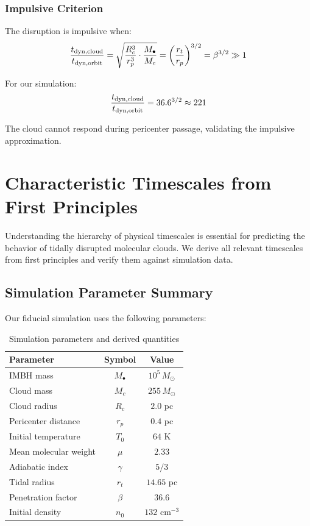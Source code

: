 \documentclass[twocolumn,amsmath,amssymb,prd,superscriptaddress,nofootinbib]{revtex4-2}
\begin{document}
\subsubsection{Impulsive Criterion}

The disruption is impulsive when:
\begin{equation}
    \frac{t_{\rm dyn,cloud}}{t_{\rm dyn,orbit}} = \sqrt{\frac{R_c^3}{r_p^3}\cdot\frac{M_\bullet}{M_c}} = \left(\frac{r_t}{r_p}\right)^{3/2} = \beta^{3/2} \gg 1
    \label{eq:impulsive}
\end{equation}

For our simulation:
\begin{equation}
    \frac{t_{\rm dyn,cloud}}{t_{\rm dyn,orbit}} = 36.6^{3/2} \approx 221
\end{equation}

The cloud cannot respond during pericenter passage, validating the impulsive approximation.

\section{Characteristic Timescales from First Principles}
\label{sec:timescales}

Understanding the hierarchy of physical timescales is essential for predicting the behavior of tidally disrupted molecular clouds. We derive all relevant timescales from first principles and verify them against simulation data.

\subsection{Simulation Parameter Summary}
\label{sec:sim_params}

Our fiducial simulation uses the following parameters:

\begin{table}[h]
\centering
\caption{Simulation parameters and derived quantities}
\label{tab:sim_params}
\begin{tabular}{lcc}
\toprule
Parameter & Symbol & Value \\
\midrule
IMBH mass & $M_\bullet$ & $10^5\,M_\odot$ \\
Cloud mass & $M_c$ & $255\,M_\odot$ \\
Cloud radius & $R_c$ & $2.0$ pc \\
Pericenter distance & $r_p$ & $0.4$ pc \\
Initial temperature & $T_0$ & $64$ K \\
Mean molecular weight & $\mu$ & $2.33$ \\
Adiabatic index & $\gamma$ & $5/3$ \\
Tidal radius & $r_t$ & $14.65$ pc \\
Penetration factor & $\beta$ & $36.6$ \\
Initial density & $n_0$ & $132$ cm$^{-3}$ \\
\bottomrule
\end{tabular}
\end{table}
\end{document}
